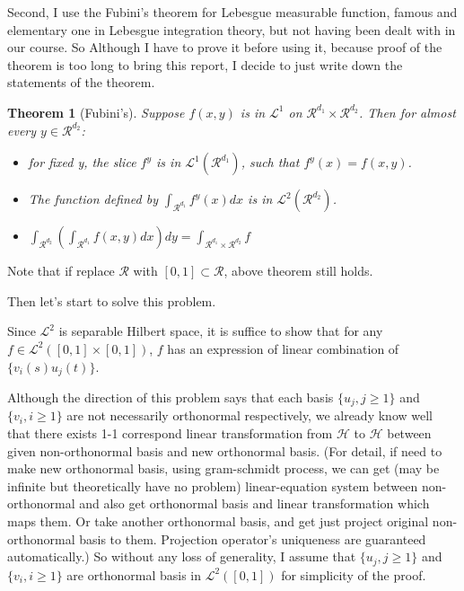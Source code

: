 \documentclass{article}
\newtheorem*{theorem}{Theorem}
\begin{document}
Second, I use the Fubini's theorem for Lebesgue measurable function, famous and elementary one in Lebesgue integration theory,
but not having been dealt with in our course. So Although I have to prove it before using it,
because proof of the theorem is too long to bring this report,
I decide to just write down the statements of the theorem.

\begin{theorem}[Fubini's]
    Suppose $f(x,y)$ is in $\mathcal{L}^1$ on $\mathcal{R}^{d_1}\times \mathcal{R}^{d_2}$.
    Then for almost every $y \in \mathcal{R}^{d_2}$:
    \begin{itemize}
        \item for fixed y, the slice $f^y$ is in $\mathcal{L}^1(\mathcal{R}^{d_1})$, such that $f^y(x)=f(x,y)$.
        \item The function defined by $\int_{\mathcal{R}^{d_1}}f^y(x)dx$ is in $\mathcal{L}^2(\mathcal{R}^{d_2})$.
        \item $\int_{\mathcal{R}^{d_2}}(\int_{\mathcal{R}^{d_1}}f(x,y)dx)dy=\int_{\mathcal{R}^{d_1}\times \mathcal{R}^{d_2}}f$
    \end{itemize}
\end{theorem}
Note that if replace $\mathcal{R}$ with $[0,1]\subset\mathcal{R}$, above theorem still holds.

Then let's start to solve this problem.

Since $\mathcal{L}^2$ is separable Hilbert space, it is suffice to show that for any $f\in \mathcal{L}^2([0,1]\times[0,1])$,
$f$ has an expression of linear combination of $\{v_i(s)u_j(t)\}$.

Although the direction of this problem says that each basis $\{u_j, j\geq 1\}$ and $\{v_i, i\geq 1\}$ are not necessarily orthonormal respectively, 
we already know well that there exists 1-1 correspond linear transformation from $\mathcal{H}$ to $\mathcal{H}$ between
given non-orthonormal basis and new orthonormal basis. 
(For detail, if need to make new orthonormal basis, using gram-schmidt process, we can get (may be infinite but theoretically have no problem)
linear-equation system between non-orthonormal and also get orthonormal basis and linear transformation which maps them.
Or take another orthonormal basis, and get just project original non-orthonormal basis to them. 
Projection operator's uniqueness are guaranteed automatically.)
So without any loss of generality, I assume that $\{u_j, j\geq 1\}$ and $\{v_i, i\geq 1\}$ are
orthonormal basis in $\mathcal{L}^2([0,1])$ for simplicity of the proof.
\end{document}
